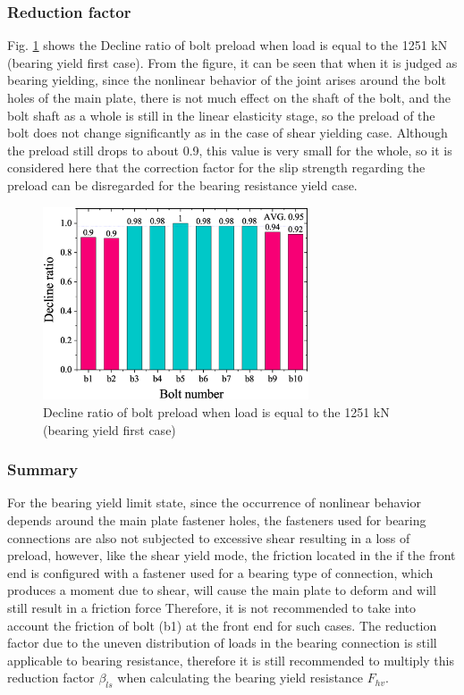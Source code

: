 \subsubsection{Reduction factor}

Fig. \ref{fig-beafstls} shows the Decline ratio of bolt preload when load is equal to the 1251 kN (bearing yield first case). From the figure, it can be seen that when it is judged as bearing yielding, since the nonlinear behavior of the joint arises around the bolt holes of the main plate, there is not much effect on the shaft of the bolt, and the bolt shaft as a whole is still in the linear elasticity stage, so the preload of the bolt does not change significantly as in the case of shear yielding case. Although the preload still drops to about 0.9, this value is very small for the whole, so it is considered here that the correction factor for the slip strength regarding the preload can be disregarded for the bearing resistance yield case.

\begin{figure}[htbp]
    \centering
    \includegraphics[width=0.7\textwidth]{imgs/ch7/b4t30w27-ls.eps}
    \caption{Decline ratio of bolt preload when load is equal to the 1251 kN (bearing yield first case)}
    \label{fig-beafstls}
\end{figure}


\subsubsection{Summary}

For the bearing yield limit state, since the occurrence of nonlinear behavior depends around the main plate fastener holes, the fasteners used for bearing connections are also not subjected to excessive shear resulting in a loss of preload, however, like the shear yield mode, the friction located in the if the front end is configured with a fastener used for a bearing type of connection, which produces a moment due to shear, will cause the main plate to deform and will still result in a friction force Therefore, it is not recommended to take into account the friction of bolt (b1) at the front end for such cases. The reduction factor due to the uneven distribution of loads in the bearing connection is still applicable to bearing resistance, therefore it is still recommended to multiply this reduction factor $\beta_{ls}$ when calculating the bearing yield resistance $F_{hv}$.

